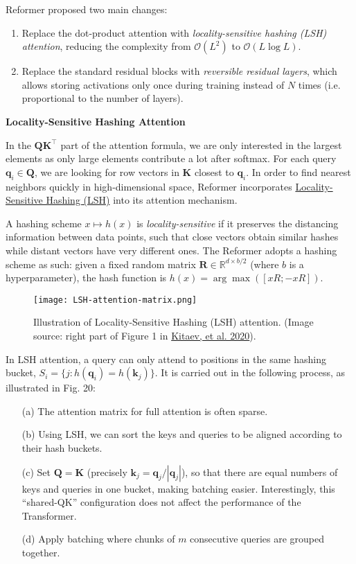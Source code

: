 \documentclass[12pt]{article}
\begin{document}
Reformer proposed two main changes:
\begin{enumerate}
    \item Replace the dot-product attention with \emph{locality-sensitive hashing (LSH) attention}, reducing the complexity from $\mathcal{O}(L^2)$ to $\mathcal{O}(L\log L)$.
    \item Replace the standard residual blocks with \emph{reversible residual layers}, which allows storing activations only once during training instead of $N$ times (i.e. proportional to the number of layers).
\end{enumerate}

\textbf{Locality-Sensitive Hashing Attention}

In the $\mathbf{Q} \mathbf{K}^\top$ part of the attention formula, we are only interested in the largest elements as only large elements contribute a lot after softmax. For each query $\mathbf{q}_i \in \mathbf{Q}$, we are looking for row vectors in $\mathbf{K}$ closest to $\mathbf{q}_i$. In order to find nearest neighbors quickly in high-dimensional space, Reformer incorporates \href{https://en.wikipedia.org/wiki/Locality-sensitive_hashing}{Locality-Sensitive Hashing (LSH)} into its attention mechanism.

A hashing scheme $x \mapsto h(x)$ is \emph{locality-sensitive} if it preserves the distancing information between data points, such that close vectors obtain similar hashes while distant vectors have very different ones. The Reformer adopts a hashing scheme as such: given a fixed random matrix $\mathbf{R} \in \mathbb{R}^{d \times b/2}$ (where $b$ is a hyperparameter), the hash function is $h(x) = \arg\max([xR; -xR])$.

\begin{figure}[h!]
    \centering
    \texttt{[image: LSH-attention-matrix.png]}
    \caption{Illustration of Locality-Sensitive Hashing (LSH) attention. (Image source: right part of Figure 1 in \href{https://arxiv.org/abs/2001.04451}{Kitaev, et al. 2020}).}
\end{figure}

In LSH attention, a query can only attend to positions in the same hashing bucket, $S_i = \{j: h(\mathbf{q}_i) = h(\mathbf{k}_j)\}$. It is carried out in the following process, as illustrated in Fig. 20:
\begin{itemize}
    \item[(a)] The attention matrix for full attention is often sparse.
    \item[(b)] Using LSH, we can sort the keys and queries to be aligned according to their hash buckets.
    \item[(c)] Set $\mathbf{Q} = \mathbf{K}$ (precisely $\mathbf{k}_j = \mathbf{q}_j / |\mathbf{q}_j|$), so that there are equal numbers of keys and queries in one bucket, making batching easier. Interestingly, this ``shared-QK'' configuration does not affect the performance of the Transformer.
    \item[(d)] Apply batching where chunks of $m$ consecutive queries are grouped together.
\end{itemize}
\end{document}

